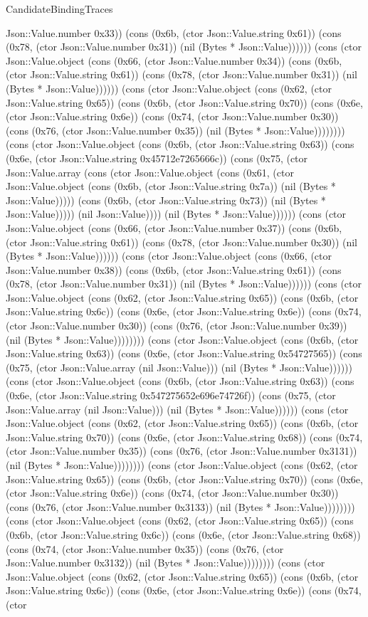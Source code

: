 \begin{lexlean}{CandidateBindingTraces}
\begin{semanticmodule}
{Json::Value.number 0x33)) (cons (0x6b, (ctor Json::Value.string 0x61)) (cons (0x78, (ctor Json::Value.number 0x31)) (nil (Bytes * Json::Value)))))) (cons (ctor Json::Value.object (cons (0x66, (ctor Json::Value.number 0x34)) (cons (0x6b, (ctor Json::Value.string 0x61)) (cons (0x78, (ctor Json::Value.number 0x31)) (nil (Bytes * Json::Value)))))) (cons (ctor Json::Value.object (cons (0x62, (ctor Json::Value.string 0x65)) (cons (0x6b, (ctor Json::Value.string 0x70)) (cons (0x6e, (ctor Json::Value.string 0x6e)) (cons (0x74, (ctor Json::Value.number 0x30)) (cons (0x76, (ctor Json::Value.number 0x35)) (nil (Bytes * Json::Value)))))))) (cons (ctor Json::Value.object (cons (0x6b, (ctor Json::Value.string 0x63)) (cons (0x6e, (ctor Json::Value.string 0x45712e7265666c)) (cons (0x75, (ctor Json::Value.array (cons (ctor Json::Value.object (cons (0x61, (ctor Json::Value.object (cons (0x6b, (ctor Json::Value.string 0x7a)) (nil (Bytes * Json::Value))))) (cons (0x6b, (ctor Json::Value.string 0x73)) (nil (Bytes * Json::Value))))) (nil Json::Value)))) (nil (Bytes * Json::Value)))))) (cons (ctor Json::Value.object (cons (0x66, (ctor Json::Value.number 0x37)) (cons (0x6b, (ctor Json::Value.string 0x61)) (cons (0x78, (ctor Json::Value.number 0x30)) (nil (Bytes * Json::Value)))))) (cons (ctor Json::Value.object (cons (0x66, (ctor Json::Value.number 0x38)) (cons (0x6b, (ctor Json::Value.string 0x61)) (cons (0x78, (ctor Json::Value.number 0x31)) (nil (Bytes * Json::Value)))))) (cons (ctor Json::Value.object (cons (0x62, (ctor Json::Value.string 0x65)) (cons (0x6b, (ctor Json::Value.string 0x6c)) (cons (0x6e, (ctor Json::Value.string 0x6e)) (cons (0x74, (ctor Json::Value.number 0x30)) (cons (0x76, (ctor Json::Value.number 0x39)) (nil (Bytes * Json::Value)))))))) (cons (ctor Json::Value.object (cons (0x6b, (ctor Json::Value.string 0x63)) (cons (0x6e, (ctor Json::Value.string 0x54727565)) (cons (0x75, (ctor Json::Value.array (nil Json::Value))) (nil (Bytes * Json::Value)))))) (cons (ctor Json::Value.object (cons (0x6b, (ctor Json::Value.string 0x63)) (cons (0x6e, (ctor Json::Value.string 0x547275652e696e74726f)) (cons (0x75, (ctor Json::Value.array (nil Json::Value))) (nil (Bytes * Json::Value)))))) (cons (ctor Json::Value.object (cons (0x62, (ctor Json::Value.string 0x65)) (cons (0x6b, (ctor Json::Value.string 0x70)) (cons (0x6e, (ctor Json::Value.string 0x68)) (cons (0x74, (ctor Json::Value.number 0x35)) (cons (0x76, (ctor Json::Value.number 0x3131)) (nil (Bytes * Json::Value)))))))) (cons (ctor Json::Value.object (cons (0x62, (ctor Json::Value.string 0x65)) (cons (0x6b, (ctor Json::Value.string 0x70)) (cons (0x6e, (ctor Json::Value.string 0x6e)) (cons (0x74, (ctor Json::Value.number 0x30)) (cons (0x76, (ctor Json::Value.number 0x3133)) (nil (Bytes * Json::Value)))))))) (cons (ctor Json::Value.object (cons (0x62, (ctor Json::Value.string 0x65)) (cons (0x6b, (ctor Json::Value.string 0x6c)) (cons (0x6e, (ctor Json::Value.string 0x68)) (cons (0x74, (ctor Json::Value.number 0x35)) (cons (0x76, (ctor Json::Value.number 0x3132)) (nil (Bytes * Json::Value)))))))) (cons (ctor Json::Value.object (cons (0x62, (ctor Json::Value.string 0x65)) (cons (0x6b, (ctor Json::Value.string 0x6c)) (cons (0x6e, (ctor Json::Value.string 0x6e)) (cons (0x74, (ctor }
\end{semanticmodule}
\end{lexlean}
